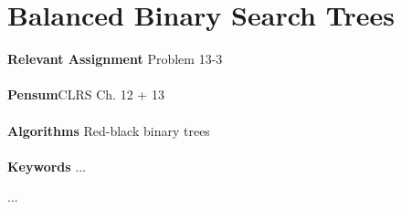 
\chapter{Balanced Binary Search Trees}
\label{ch:balancedbinarysearchtrees}

\textbf{Relevant Assignment} Problem 13-3\\\\
\textbf{Pensum}CLRS Ch. 12 + 13\\\\
\textbf{Algorithms} Red-black binary trees\\\\
\textbf{Keywords} ...
\vspace{1in}

\noindent ...

